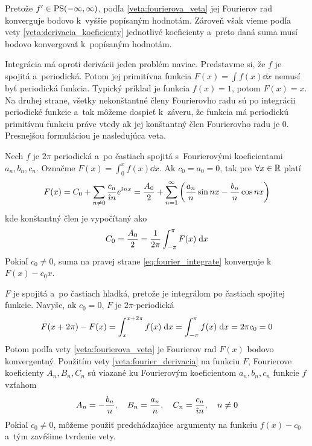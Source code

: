 \begin{dokaz}
  Pretože $f'\in \mbox{PS}(-\infty,\infty)$, podľa \ref{veta:fourierova_veta} jej Fourierov rad
  konverguje bodovo k~vyššie popísaným hodnotám. Zároveň však vieme
  podľa vety \ref{veta:derivacia_koeficienty} jednotlivé koeficienty
  a~preto daná suma musí bodovo konvergovať k~popísaným hodnotám.
\end{dokaz}

Integrácia má oproti derivácii jeden problém naviac.
Predstavme si, že $f$ je spojitá a~periodická. Potom jej primitívna
funkcia
$F(x) = \int f(x) \dd x$ nemusí byť periodická funkcia.
 Typický príklad je funkcia $f(x)=1$, potom $F(x)=x$. Na druhej strane,
 všetky nekonštantné členy Fourierovho radu sú po integrácii
 periodické funkcie a~tak môžeme dospieť k~záveru, že funkcia má
 periodickú primitívnu funkciu práve vtedy ak jej konštantný člen
 Fourierovho radu je 0. Presnejšou formuláciou je nasledujúca veta.

\begin{veta}
    Nech $f$ je $2\pi$ periodická a~po častiach spojitá s~Fourierovými
    koeficientami $a_n,b_n,c_n$. Označme
    $F(x) = \int_{0}^{x} f(x) \dd x$. Ak $c_0 = a_0 =0$, tak 
    pre $\forall x\in {\mathbb R}$ platí
    \begin{equation}
        F(x) = C_0 + \sum_{n\not=0} \frac{c_n}{\hat{\imath} n} e^{\hat{\imath} n x}
        = \frac{A_0}{2} + \sum_{n=1}^{\infty} \left(
                \frac{a_n}{n} \sin nx - \frac{b_n}{n} \cos nx\right)
    \label{eq:fourier_integrate}
    \end{equation}
    kde konštantný člen je vypočítaný ako 
    \begin{equation*}
        C_0 = \frac{A_0}{2} = \frac{1}{2\pi} \int_{-\pi}^{\pi} F(x) \; \mathrm{d} x
    \end{equation*}
    Pokiaľ $c_0\not=0$, suma na pravej strane
    \eqref{eq:fourier_integrate} konverguje k $F(x) - c_0 x$.
    \label{veta:fourier_integrovanie}
\end{veta}

\begin{dokaz}
    $F$ je spojitá a~po častiach hladká, pretože je integrálom po
    častiach spojitej funkcie. Navyše, ak $c_0=0$, $F$ je
    $2\pi$-periodická 
    \begin{equation*}
        F(x + 2\pi) -F(x) =\int_x^{x+2\pi} f(x) \; \mathrm{d} x =
            \int_{-\pi}^{\pi} f(x) \; \mathrm{d} x = 2 \pi c_0 = 0
    \end{equation*}
    Potom podľa vety \ref{veta:fourierova_veta} je
    Fourierov rad $F(x)$ bodovo konvergentný. Použitím vety
    \ref{veta:fourier_derivacia} na funkciu $F$, Fourierove
    koeficienty $A_n,B_n,C_n$ sú viazané ku Fourierovým koeficientom
    $a_n,b_n,c_n$ funkcie $f$ vzťahom
    \begin{equation*}
        A_n = -\frac{b_n}{n}, \quad
        B_n = \frac{a_n}{n}, \quad
        C_n = \frac{c_n}{\hat{\imath} n}, \quad n\not=0
    \end{equation*}
    Pokiaľ $c_0\not=0$, môžeme použiť predchádzajúce argumenty na
    funkciu $f(x)-c_0$ a~tým zavŕšime tvrdenie vety.    
    \end{dokaz}

